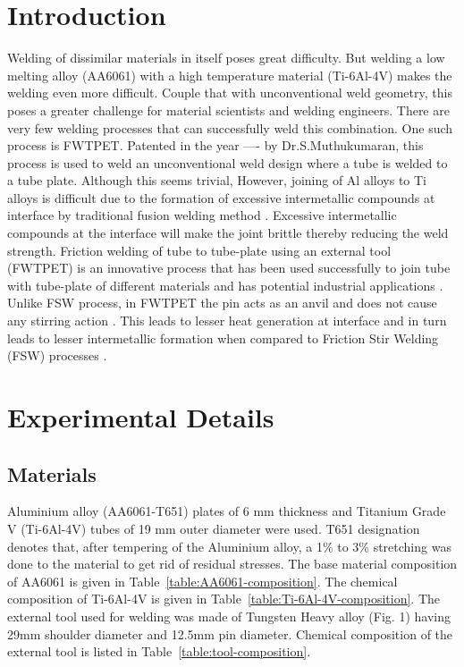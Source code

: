 \documentclass[preprint]{elsarticle}
\begin{document}
\linenumbers
								
\section{Introduction}
\label{sec:Introduction}
Welding of dissimilar materials in itself poses great difficulty. But welding a low melting alloy (AA6061) with a high temperature material (Ti-6Al-4V) makes the welding even more difficult. Couple that with unconventional weld geometry, this poses a greater challenge for material scientists and welding engineers. There are very few welding processes that can successfully weld this combination. One such process is FWTPET. Patented in the year ---- by Dr.S.Muthukumaran, this process is used to weld an unconventional weld design where a tube is welded to a tube plate. Although this seems trivial, %
However, joining of Al alloys to Ti alloys is difficult due to the formation of excessive intermetallic compounds at interface by traditional fusion welding method \cite{Fuji2002}. Excessive intermetallic compounds at the interface will make the joint brittle thereby reducing the weld strength. 
Friction welding of tube to tube-plate using an external tool (FWTPET) is an innovative process that has been used successfully to join tube with tube-plate of different materials and has potential industrial applications \cite{Kumaran2011}. Unlike FSW process, in FWTPET the pin acts as an anvil and does not cause any stirring action \cite{SenthilKumaran2011}. This leads to lesser heat generation at interface and in turn leads to lesser intermetallic formation when compared to Friction Stir Welding (FSW) processes \cite{MadhusudhanReddy2009}.


\section{Experimental Details} 
\label{sec:Experimental Details}
\subsection{Materials}
\label{subsec:Materials}
Aluminium alloy (AA6061-T651) plates of 6 mm thickness and Titanium Grade V (Ti-6Al-4V) tubes of 19 mm outer diameter were used. T651 designation denotes that, after tempering of the Aluminium alloy, a 1\% to 3\% stretching was done to the material to get rid of residual stresses. The base material composition of AA6061 is given in Table~\ref{table:AA6061-composition}. The chemical composition of Ti-6Al-4V is given in Table~\ref{table:Ti-6Al-4V-composition}. The external tool used for welding was made of Tungsten Heavy alloy (Fig. 1) having 29mm shoulder diameter and 12.5mm pin diameter. Chemical composition of the external tool is listed in Table~\ref{table:tool-composition}. 
\end{document}
